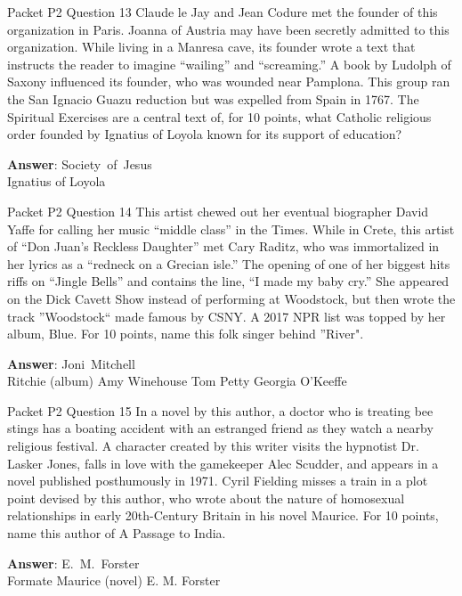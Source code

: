 \begin{frame}{Packet P2 Question 13}
Claude le Jay and Jean Codure met the founder of this organization in Paris. Joanna of Austria may have been secretly admitted to this organization. While living in a Manresa cave, its founder wrote a text that instructs the reader to imagine ``wailing'' and ``screaming.'' A book by Ludolph of Saxony influenced   its founder, who was wounded near Pamplona. This group   ran the San Ignacio Guazu reduction but was expelled from Spain in 1767. The Spiritual Exercises are a central text of, for 10 points, what Catholic religious order founded by Ignatius   of Loyola known     for its support of education?

\textbf{Answer}: Society\ of\ Jesus\\
 Ignatius of Loyola
\end{frame}

\begin{frame}{Packet P2 Question 14}
This artist chewed out her eventual biographer David Yaffe for calling her music “middle class” in the Times. While in Crete, this artist of “Don Juan’s Reckless Daughter” met Cary Raditz, who was immortalized in her lyrics as a ``redneck on a Grecian isle.'' The opening of one of her biggest hits riffs on ``Jingle Bells'' and contains the line, ``I made my baby cry.” She appeared on the Dick Cavett Show instead of performing at Woodstock, but then wrote the track ''Woodstock`` made famous by CSNY. A 2017 NPR list was topped by her album, Blue. For 10 points, name this folk singer behind ''River".        

\textbf{Answer}: Joni\ Mitchell\\
 Ritchie (album)
 Amy Winehouse
 Tom Petty
 Georgia O'Keeffe
\end{frame}

\begin{frame}{Packet P2 Question 15}
In a novel by this author, a doctor who is treating bee stings has a boating accident   with an estranged friend as they watch a nearby religious festival. A character created by this writer visits the hypnotist Dr. Lasker Jones,   falls in love with the gamekeeper Alec Scudder, and appears   in a novel published posthumously in 1971. Cyril Fielding misses a train in a plot point devised by this author, who wrote about the nature of homosexual relationships in early 20th-Century Britain in his novel Maurice.   For 10 points, name this author of A Passage to India.  

\textbf{Answer}: E.\ M.\ Forster\\
 Formate
 Maurice (novel)
 E. M. Forster
\end{frame}


